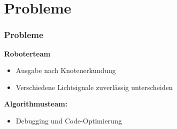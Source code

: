\documentclass[ddcfooter,nototalpage]{tudbeamer}
\begin{document}
\section{Probleme}
\begin{frame}
\frametitle{Probleme}
\normalsize
\textbf{Roboterteam}
\begin{itemize}
\item Ausgabe nach Knotenerkundung
\item Verschiedene Lichtsignale zuverlässig unterscheiden

\end{itemize}
\textbf{ }
\textbf{Algorithmusteam:}
\begin{itemize}
\item Debugging und Code-Optimierung
\end{itemize}
\end{frame}
\end{document}
